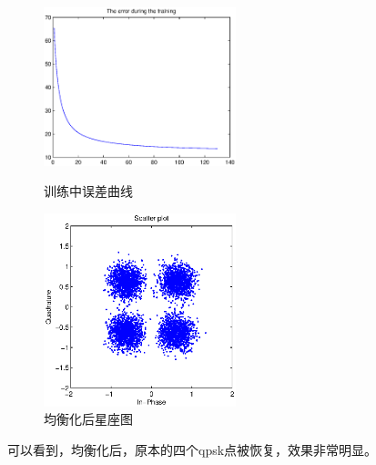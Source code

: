 \documentclass{article}
\begin{document}
\begin{figure}[h]
\begin{minipage}[t]{0.5\linewidth}
\centering
\includegraphics[width=2.2in]{4.eps}
\caption{训练中误差曲线}
\label{fig:side:a}
\end{minipage}%
\begin{minipage}[t]{0.5\linewidth}
\centering
\includegraphics[width=2.2in]{5.eps}
\caption{均衡化后星座图}
\label{fig:side:b}
\end{minipage}
\end{figure}
可以看到，均衡化后，原本的四个qpsk点被恢复，效果非常明显。
\end{document}
